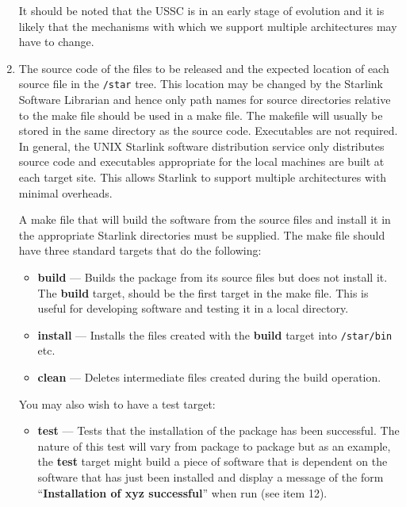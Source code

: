 \begin{enumerate}
It should be noted that the USSC is in an early stage of evolution and it
is likely that the mechanisms with which we support multiple architectures
may have to change. 

\item The source code of the files to be released and the expected location
of each source file in the {\tt /star} tree. This location may be changed by
the  Starlink  Software Librarian and hence only path names for source
directories relative to the make file should be used in a make file. The
makefile will usually  be stored in the same directory as the source code.
Executables are not required. In general, the UNIX Starlink software
distribution  service only distributes source code and executables appropriate
for the local machines are built at each target site. This allows Starlink to
support multiple architectures with minimal overheads. 

A make file that will build the software from the source files and
install it in the appropriate Starlink directories must be supplied.
The make file should have three standard targets that do the following:

\begin{itemize}

\item {\bf build} --- Builds the package from its source files but does not
install it. The {\bf build} target, should be the first target
in the make file. This is useful for developing software and testing it 
in a local directory.

\item {\bf install} --- Installs the files created with the {\bf build}
target into {\tt /star/bin} etc. 

\item {\bf clean} --- Deletes intermediate files created during the build
operation.

\end{itemize}

You may also wish to have a test target:

\begin{itemize}


\item {\bf test} --- Tests that the installation of the package has been
successful. The nature of this test will vary from package to package but as
an example, the {\bf test} target might build a piece of software that is 
dependent on the software that has just been installed and display a
message of the form ``{\bf Installation of xyz successful}'' when run
(see item 12).


\end{itemize}
\end{enumerate}
